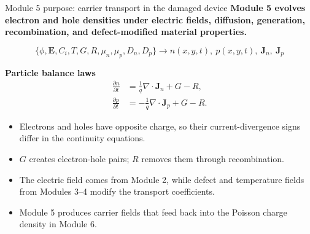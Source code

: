 \documentclass[aspectratio=169,10pt]{beamer}
\begin{document}
\begin{frame}{Module 5 purpose: carrier transport in the damaged device}
\small
\textbf{Module 5 evolves electron and hole densities under electric fields, diffusion, generation, recombination, and defect-modified material properties.}

\vspace{0.25em}
\begin{equation*}
\boxed{
\{\phi,\mathbf E,C_i,T,G,R,\mu_n,\mu_p,D_n,D_p\}
\longrightarrow
n(x,y,t),\ p(x,y,t),\ \mathbf J_n,\ \mathbf J_p
}
\end{equation*}

\vspace{-0.1em}
\textbf{Particle balance laws}
\vspace{-0.25em}
\begin{align*}
\frac{\partial n}{\partial t}&=\frac{1}{q}\nabla\cdot\mathbf J_n+G-R,\\[-0.15em]
\frac{\partial p}{\partial t}&=-\frac{1}{q}\nabla\cdot\mathbf J_p+G-R.
\end{align*}

\vspace{-0.15em}
\begin{itemize}
    \item Electrons and holes have opposite charge, so their current-divergence signs differ in the continuity equations.
    \item $G$ creates electron-hole pairs; $R$ removes them through recombination.
    \item The electric field comes from Module 2, while defect and temperature fields from Modules 3--4 modify the transport coefficients.
    \item Module 5 produces carrier fields that feed back into the Poisson charge density in Module 6.
\end{itemize}
\end{frame}
\end{document}
